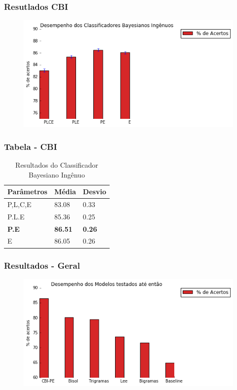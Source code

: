 \documentclass[xcolor=table]{beamer}
\begin{document}
	\begin{frame}
		\frametitle{Resutlados CBI}
		\begin{figure}
\centering
\includegraphics[width=0.9\linewidth]{resultadosnbc}
\label{fig:resultadosnbc}
\end{figure}

	\end{frame}
	\begin{frame}
		\frametitle{Tabela - CBI}
		\begin{table}[]
			\centering
			\caption{Resultados do Classificador Bayesiano Ingênuo}
			\label{my-label}
			\begin{tabular}{@{}lll@{}}
				\toprule
				Parâmetros & Média & Desvio \\ \midrule
				P,L,C,E    & 83.08 & 0.33   \\
				P.L.E      & 85.36 & 0.25   \\
				\textbf{P.E}        & \textbf{86.51} & \textbf{0.26}   \\
				E          & 86.05 & 0.26   \\ \bottomrule
			\end{tabular}
		\end{table}
	\end{frame}
	\begin{frame}
		\frametitle{Resultados - Geral}
		\begin{figure}
\centering
\includegraphics[width=0.9\linewidth]{resultadosgeral}
\label{fig:resultadosgeral}
\end{figure}

	\end{frame}
\end{document}
